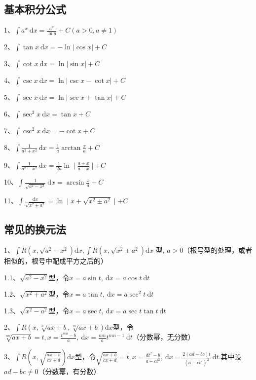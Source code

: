 \subsection{基本积分公式}

1、$\int a^{x} \mathrm{~d} x=\frac{a^{x}}{\ln a}+C(a>0, a \neq 1)$

2、$\int \tan x \mathrm{~d} x=-\ln |\cos x|+C$

3、$\int \cot x \mathrm{~d} x=\ln |\sin x|+C$

4、$\int \csc x \mathrm{~d} x=\ln |\csc x-\cot x|+C$

5、$\int \sec x \mathrm{~d} x=\ln |\sec x+\tan x|+C$

6、$\int \sec ^{2} x \mathrm{~d} x=\tan x+C$

7、$\int \csc ^{2} x \mathrm{~d} x=-\cot x+C$

8、$\int \frac{1}{a^{2}+x^{2}} \mathrm{~d} x=\frac{1}{a} \arctan \frac{x}{a}+C$

9、$\int \frac{1}{a^{2}-x^{2}} \mathrm{~d} x=\frac{1}{2 a} \ln \mid \frac{a+x}{a-x} \mid+C$

10、$\int \frac{1}{\sqrt{a^{2}-x^{2}}} \mathrm{~d} x=\arcsin \frac{x}{a}+C$

11、$\int \frac{\mathrm{d} x}{\sqrt{x^{2} \pm a^{2}}}=\ln \mid x+\sqrt{x^{2} \pm a^{2}} \mid+ C$



\subsection{常见的换元法}

1、$\int R\left(x, \sqrt{a^{2}-x^{2}}\right) \mathrm{d} x, \int R\left(x, \sqrt{x^{2} \pm a^{2}}\right) \mathrm{d} x \text { 型, } a>0$（根号型的处理，或者相似的，根号中配成平方之后的）

1.1、$\sqrt{a^{2}-x^{2}}$型，令$x=a \sin t, \mathrm{~d} x=a \cos t \mathrm{~d} t$

1.2、$\sqrt{x^{2}+a^{2}}$型，令$x=a \tan t, \mathrm{~d} x=a \sec ^{2} t \mathrm{~d} t$

1.3、$\sqrt{x^{2}-a^{2}}$型，令$x=a \sec t, \mathrm{~d} x=a \sec t \tan t \mathrm{~d} t$

2、$\int R(x, \sqrt[n]{a x+b}, \sqrt[m]{a x+b}) \mathrm{d} x$型，令$\sqrt[n n]{a x+b}=t, x=\frac{t^{m n}-b}{a}, \mathrm{~d} x=\frac{m n}{a} t^{m n-1} \mathrm{~d} t$（分数幂，无分数）

3、$\int R\left(x, \sqrt{\frac{a x+b}{c x+d}}\right) \mathrm{d} x$型，令$\sqrt{\frac{a x+b}{c x+d}}=t, x=\frac{d t^{2}-b}{a-c t^{2}}, \mathrm{~d} x=\frac{2(a d-b c) t}{\left(a-c t^{2}\right)^{2}} \mathrm{~d} t .$其中设$a d-b c \neq 0$（分数幂，有分数）

